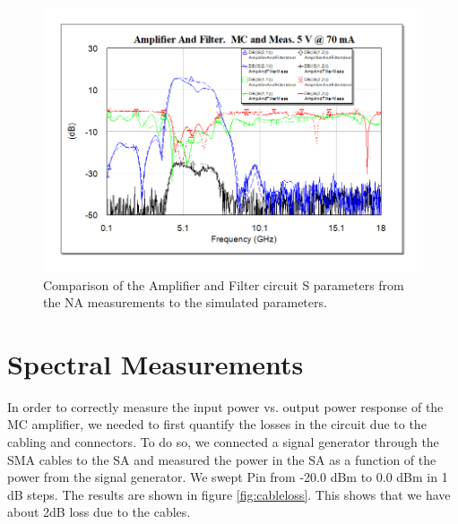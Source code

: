 \documentclass[twocolumn, aps, apl]{revtex4-1}
\begin{document}
\begin{figure}[!htbp]
    \centering
    \includegraphics[scale=0.45]{AmpAndFilterMCandMeasured.png}
    \caption{Comparison of the Amplifier and Filter circuit S parameters from the NA measurements to the simulated parameters.}
    \label{fig:ampfilter}
\end{figure}

\FloatBarrier

\section*{Spectral Measurements}

In order to correctly measure the input power vs. output power response of the MC amplifier, we needed to first quantify the losses in the circuit due to the cabling and connectors. To do so, we connected a signal generator through the SMA cables to the SA and measured the power in the SA as a function of the power from the signal generator. We swept Pin from -20.0 dBm to 0.0 dBm in 1 dB steps. The results are shown in figure \ref{fig:cableloss}. This shows that we have about 2dB loss due to the cables.
\end{document}
